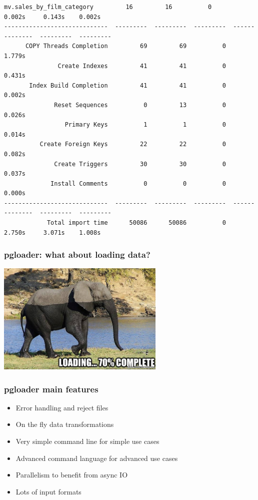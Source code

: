 \documentclass{beamer}
\begin{document}
\begin{frame}[fragile]
\begin{Verbatim}[fontsize=\tiny]
    mv.sales_by_film_category         16         16          0          0.002s     0.143s    0.002s
-----------------------------  ---------  ---------  ---------  --------------  ---------  ---------
      COPY Threads Completion         69         69          0          1.779s                     
               Create Indexes         41         41          0          0.431s                     
       Index Build Completion         41         41          0          0.002s                     
              Reset Sequences          0         13          0          0.026s                     
                 Primary Keys          1          1          0          0.014s                     
          Create Foreign Keys         22         22          0          0.082s                     
              Create Triggers         30         30          0          0.037s                     
             Install Comments          0          0          0          0.000s                     
-----------------------------  ---------  ---------  ---------  --------------  ---------  ---------
            Total import time      50086      50086          0          2.750s     3.071s    1.008s
\end{Verbatim}
\end{frame}

\begin{frame}
  \frametitle{pgloader: what about loading data?}


  \begin{center}
    \includegraphics[height=2.1in]{elephant-loading.jpg}
  \end{center}
\end{frame}

\begin{frame}[fragile]
  \frametitle{pgloader main features}

  \vfill
  
  \begin{itemize}
  \item Error handling and reject files
  \item On the fly data transformations
  \item Very simple command line for simple use cases
  \item Advanced command language for advanced use cases
  \item Parallelism to benefit from async IO
  \item Lots of input formats
  \end{itemize}  
\end{frame}
\end{document}
